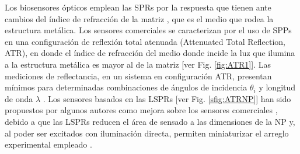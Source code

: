 Los biosensores ópticos emplean las SPRs por la respuesta que tienen ante cambios del índice de refracción de la matriz \cite{kabashin2009plasmonic}, que es el medio que rodea la estructura metálica.  Los sensores comerciales se caracterizan por el uso de SPPs \cite{estevez2014trends} en una configuración de reflexión total atenuada (Attenuated Total Reflection, ATR), en donde el índice de refracción del medio donde incide la luz que ilumina a la estructura metálica es mayor al de la matriz [ver Fig.  \ref{fig:ATR1}].  Las mediciones de reflectancia, en un sistema en configuración ATR, presentan mínimos para determinadas combinaciones de  ángulos de incidencia $\theta_i$ y longitud de onda $\lambda$  \cite{danilov2018ultra}.  Los sensores basados en las LSPRs [ver Fig. \ref{sfig:ATRNP}] han sido propuestos por algunos autores como mejora sobre los sensores comerciales \cite{jain2008noble,kabashin2009plasmonic},  debido a que las LSPRs reducen el área de sensado a las dimensiones de la NP y, al poder ser excitados con iluminación directa, permiten miniaturizar el arreglo experimental empleado \cite{estevez2014trends}.



